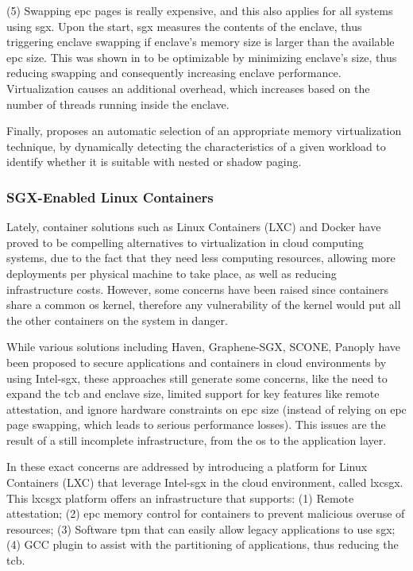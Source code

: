 (5) Swapping \gls{epc} pages is really expensive, and this also applies for all systems using \gls{sgx}. 
Upon the start, \gls{sgx} measures the contents of the enclave, thus triggering enclave swapping if enclave's memory size is larger than the available \gls{epc} size. 
This was shown in \cite{sgxVirtualizationPaper} to be optimizable by minimizing enclave's size, thus reducing swapping and consequently increasing enclave performance.
Virtualization causes an additional overhead, which increases based on the number of threads running inside the enclave.

Finally, \cite{sgxVirtualizationPaper} proposes an automatic selection of an appropriate memory virtualization technique, by dynamically detecting the characteristics of a given workload to identify whether it is suitable with nested or shadow paging.


\subsubsection{SGX-Enabled Linux Containers}
\label{sssec:sgxLinuxContainers}

Lately, container solutions such as Linux Containers (LXC) and Docker have proved to be compelling alternatives to virtualization in cloud computing systems, due to the fact that they need less computing resources, allowing more deployments per physical machine to take place, as well as reducing infrastructure costs. However, some concerns have been raised since containers share a common \gls{os} kernel, therefore any vulnerability of the kernel would put all the other containers on the system in danger.

While various solutions including Haven, Graphene-SGX, SCONE, Panoply have been proposed to secure applications and containers in cloud environments by using Intel-\gls{sgx}, these approaches still generate some concerns, like the need to expand the \gls{tcb} and enclave size, limited support for key features like remote attestation, and ignore hardware constraints on \gls{epc} size (instead of relying on \gls{epc} page swapping, which leads to serious performance losses). 
This issues are the result of a still incomplete infrastructure, from the \gls{os} to the application layer. 

In \cite{lxcsgxPaper} these exact concerns are addressed by introducing a platform for Linux Containers (LXC) that leverage Intel-\gls{sgx} in the cloud environment, called lxcsgx. 
This lxcsgx platform offers an infrastructure that supports: (1) Remote attestation; (2) \gls{epc} memory control for containers to prevent malicious overuse of resources; (3) Software \gls{tpm} that can easily allow legacy applications to use \gls{sgx}; (4) GCC plugin to assist with the partitioning of applications, thus reducing the \gls{tcb}.

